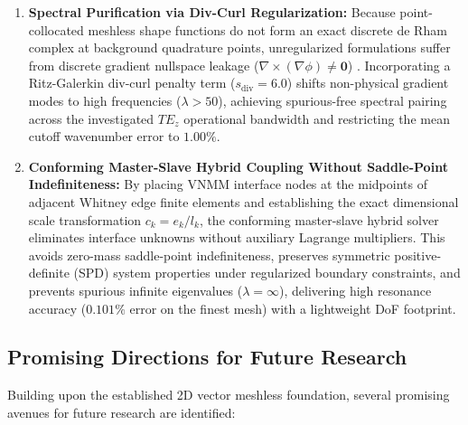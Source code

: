 \documentclass[preprint,12pt]{elsarticle}
\begin{document}
\begin{enumerate}
    \item \textbf{Spectral Purification via Div-Curl Regularization:} 
    Because point-collocated meshless shape functions do not form an exact discrete de Rham complex at background quadrature points, unregularized formulations suffer from discrete gradient nullspace leakage ($\nabla \times (\nabla \phi) \neq \mathbf{0}$) \cite{monk2003finite, bossavit1990spurious}. Incorporating a Ritz-Galerkin div-curl penalty term ($s_{\mathrm{div}} = 6.0$) shifts non-physical gradient modes to high frequencies ($\lambda > 50$), achieving spurious-free spectral pairing across the investigated $TE_z$ operational bandwidth and restricting the mean cutoff wavenumber error to $1.00\%$.

    \item \textbf{Conforming Master-Slave Hybrid Coupling Without Saddle-Point Indefiniteness:} 
    By placing VNMM interface nodes at the midpoints of adjacent Whitney edge finite elements and establishing the exact dimensional scale transformation $c_k = e_k / l_k$, the conforming master-slave hybrid solver eliminates interface unknowns without auxiliary Lagrange multipliers. This avoids zero-mass saddle-point indefiniteness, preserves symmetric positive-definite (SPD) system properties under regularized boundary constraints, and prevents spurious infinite eigenvalues ($\lambda = \infty$), delivering high resonance accuracy ($0.101\%$ error on the finest mesh) with a lightweight DoF footprint.
\end{enumerate}

\subsection{Promising Directions for Future Research}
\label{subsec:future_works}

Building upon the established 2D vector meshless foundation, several promising avenues for future research are identified:
\end{document}

